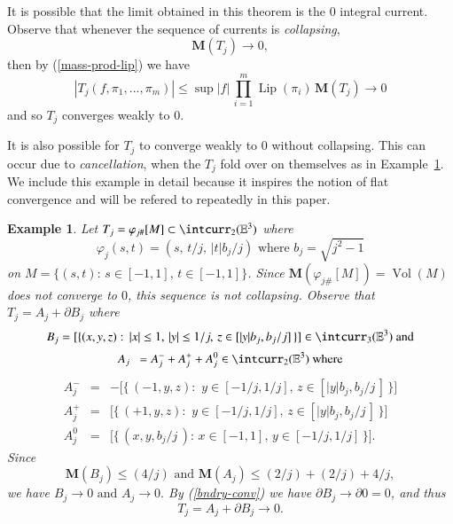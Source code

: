\documentclass[12pt]{amsart}
\newtheorem{example}[thm]{Example}
\begin{document}
It is possible that the limit obtained in this theorem
is the $0$ integral current.  Observe that whenever the sequence of
currents is {\em collapsing}, 
\begin{equation}
{{\mathbf M}}(T_j) \to 0,
\end{equation}
then by (\ref{mass-prod-lip}) we have
\begin{equation}
|T_j(f, \pi_1, ...,\pi_m)| \le \sup|f| \,\prod_{i=1}^m {\operatorname{Lip}}(\pi_i) \,{{\mathbf M}}(T_j) \to 0
\end{equation}
and so $T_j$ converges weakly to $0$.

It is also possible for $T_j$ to converge weakly to $0$ without collapsing.
This can occur due to {\em cancellation}, when the $T_j$ fold over on themselves
as in Example~\ref{ex-taco}.  We include this 
example in detail because it inspires the notion of flat convergence and will
be refered to repeatedly in this paper.

\begin{example} \label{ex-taco}
Let $T_j = \varphi_{j\#}[M]  \subset \intcurr_2({\mathbb{E}}^3)$ where
\begin{equation} \label{folding}
\varphi_j(s,t)=\left(s, \,t/j, \,|t|b_j/j\right) \textrm{ where } b_j=\sqrt{j^2-1}
\end{equation}
on  $M=\{(s,t):\, s\in [-1,1],\, t\in [-1,1]\}$.
Since 
$
{{\mathbf M}}(\varphi_{j\#}[M])={\operatorname{Vol}}(M) 
$
does not converge to $0$, this sequence is not collapsing.
Observe that 
$
T_j = A_j + \partial B_j
$ where
\begin{equation} \label{Bj}
B_j=[\{(x,y,z): \, |x|\le 1,\, |y|\le 1/j, \, z\in [|y|b_j, b_j/j] \, \}]
\in \intcurr_3({\mathbb{E}}^3) \textrm{ and}
\end{equation}
\begin{equation} \label{Aj}
A_j\,\,\,= A_{j}^-+A_{j}^+ +A_{j}^0 \in \intcurr_2({\mathbb{E}}^3)\textrm{ where}
\end{equation}
\begin{eqnarray}
A_j^- &=& -[\{\, (-1,y,z):\, \, y\in [-1/j, 1/j], \, z\in [|y| b_j, b_j/j \,]\, \}\rbrack  \\
A_j^+ &=& [\{\, (+1,y,z):\, \, y\in [-1/j, 1/j], \, z\in [|y| b_j, b_j/j \,]\, \}\rbrack   \\
A_j^0 &=& [\{\, (x, y, b_j/j\,):\,  x\in [-1,1],\, y\in [-1/j, 1/j]\, \} \rbrack.
\end{eqnarray}
Since
\begin{equation}\label{AjBjmass}
{{\mathbf M}}(B_j)\le (4/j)\textrm{ and }
{{\mathbf M}}(A_j) \le  (2/j) + (2/ j) + 4/j,
\end{equation}
we have
$
B_j {\to} 0 \textrm{ and } A_j {\to} 0.
$
By (\ref{bndry-conv}) we have $\partial B_j {\to} \partial 0=0$, and thus
\begin{equation}
T_j=A_j +\partial B_j {\to} 0.
\end{equation}
\end{example}
\end{document}
